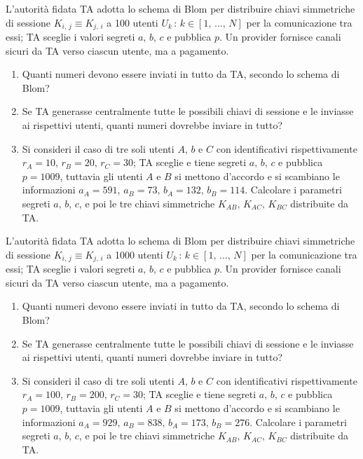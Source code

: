         L'autorità fidata TA adotta lo schema di Blom per distribuire chiavi simmetriche di sessione 
        $K_{i,\,j}\equiv K_{j,\,i}$ a 100 utenti $U_{k}\,:\,k\in [1,\,\ldots,\,N]$ per la comunicazione tra essi; 
        TA sceglie i valori segreti $a,\,b,\,c$ e pubblica $p$. Un provider fornisce canali sicuri da TA verso 
        ciascun utente, ma a pagamento.
        \begin{enumerate}
            \item Quanti numeri devono essere inviati in tutto da TA, secondo lo schema di Blom?
            \item Se TA generasse centralmente tutte le possibili chiavi di sessione e le inviasse ai rispettivi 
                utenti, quanti numeri dovrebbe inviare in tutto?
            \item Si consideri il caso di tre soli utenti $A,\,b$ e $C$ con identificativi rispettivamente 
                $r_A=10,\, r_B=20,\, r_C=30$; TA sceglie e tiene segreti $a,\,b,\,c$ e pubblica $p=1009$, tuttavia gli utenti 
                $A$ e $B$ si mettono d'accordo e si scambiano le informazioni $a_A=591,\,a_B=73,\,b_A=132,\,b_B=114$. 
                Calcolare i parametri segreti $a,\,b,\,c$, e poi le tre chiavi simmetriche $K_{AB},\, K_{AC},\, K_{BC}$ 
                distribuite da TA.
        \end{enumerate}

        L'autorità fidata TA adotta lo schema di Blom per distribuire chiavi simmetriche di sessione 
        $K_{i,\,j}\equiv K_{j,\,i}$ a 1000 utenti $U_{k}\,:\,k\in [1,\,\ldots,\,N]$ per la comunicazione tra essi; 
        TA sceglie i valori segreti $a,\,b,\,c$ e pubblica $p$. Un provider fornisce canali sicuri da TA verso 
        ciascun utente, ma a pagamento.
        \begin{enumerate}
            \item Quanti numeri devono essere inviati in tutto da TA, secondo lo schema di Blom?
            \item Se TA generasse centralmente tutte le possibili chiavi di sessione e le inviasse ai rispettivi 
                utenti, quanti numeri dovrebbe inviare in tutto?
            \item Si consideri il caso di tre soli utenti $A,\,b$ e $C$ con identificativi rispettivamente 
                $r_A=100,\, r_B=200,\, r_C=30$; TA sceglie e tiene segreti $a,\,b,\,c$ e pubblica $p=1009$, 
                tuttavia gli utenti $A$ e $B$ si mettono d'accordo e si scambiano le informazioni 
                $a_A=929,\,a_B=838,\,b_A=173,\,b_B=276$. Calcolare i parametri segreti $a,\,b,\,c$, e poi le 
                tre chiavi simmetriche $K_{AB},\, K_{AC},\, K_{BC}$ distribuite da TA.
        \end{enumerate}
